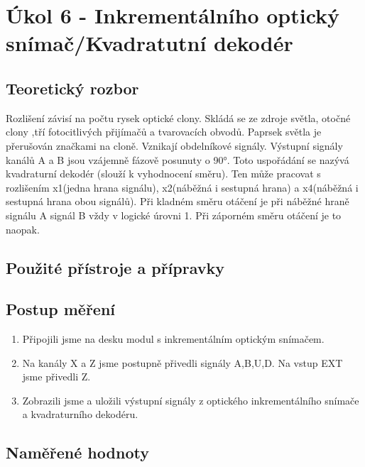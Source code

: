 \documentclass{protokol}
\begin{document}
\pagebreak


\section{Úkol 6 - Inkrementálního optický snímač/Kvadratutní dekodér}
    \subsection{Teoretický rozbor}
    \noindent Rozlišení závisí na počtu rysek optické clony. Skládá se ze zdroje světla, otočné clony ,tří fotocitlivých přijímačů a tvarovacích obvodů. Paprsek světla je přerušován značkami na cloně. Vznikají obdelníkové signály. Výstupní signály kanálů A a B jsou vzájemně fázově posunuty o 90°. Toto uspořádání se nazývá kvadraturní dekodér (slouží k vyhodnocení směru). Ten může pracovat s rozlišením x1(jedna hrana signálu), x2(náběžná i sestupná hrana) a x4(náběžná i sestupná hrana obou signálů). Při kladném směru otáčení je při náběžné hraně signálu A signál B vždy v logické úrovni 1. Při záporném směru otáčení je to naopak. 

    \subsection{Použité přístroje a přípravky}
    \subsection{Postup měření}
    \begin{enumerate}
        \item Připojili jsme na desku modul s inkrementálním optickým snímačem.
        \item Na kanály X a Z jsme postupně přivedli signály A,B,U,D. Na vstup EXT jsme přivedli Z.
        \item Zobrazili jsme a uložili výstupní signály z optického inkrementálního snímače a kvadraturního dekodéru.
    \end{enumerate}


    \clearpage
    \subsection{Naměřené hodnoty}
\end{document}
